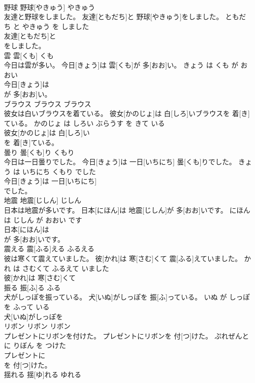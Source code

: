\documentclass[8pt]{extreport}
\begin{document}
\begin{CJK}{UTF8}{min}
\\	野球	野球[やきゅう]	やきゅう	
\\	友達と野球をしました。	友達[ともだち]と 野球[やきゅう]をしました。	ともだち と やきゅう を しました	
\\	友達[ともだち]と
\\	をしました。		
\\	雲	雲[くも]	くも	
\\	今日は雲が多い。	今日[きょう]は 雲[くも]が 多[おお]い。	きょう は くも が おおい	
\\	今日[きょう]は
\\	が 多[おお]い。		
\\	ブラウス	ブラウス	ブラウス	
\\	彼女は白いブラウスを着ている。	彼女[かのじょ]は 白[しろ]いブラウスを 着[き]ている。	かのじょ は しろい ぶらうす を きて いる	
\\	彼女[かのじょ]は 白[しろ]い
\\	を 着[き]ている。		
\\	曇り	曇[くも]り	くもり	
\\	今日は一日曇りでした。	今日[きょう]は 一日[いちにち] 曇[くも]りでした。	きょう は いちにち くもり でした	
\\	今日[きょう]は 一日[いちにち]
\\	でした。		
\\	地震	地震[じしん]	じしん	
\\	日本は地震が多いです。	日本[にほん]は 地震[じしん]が 多[おお]いです。	にほん は じしん が おおい です	
\\	日本[にほん]は
\\	が 多[おお]いです。		
\\	震える	震[ふる]える	ふるえる	
\\	彼は寒くて震えていました。	彼[かれ]は 寒[さむ]くて 震[ふる]えていました。	かれ は さむくて ふるえて いました	
\\	彼[かれ]は 寒[さむ]くて
\\	振る	振[ふ]る	ふる	
\\	犬がしっぽを振っている。	犬[いぬ]がしっぽを 振[ふ]っている。	いぬ が しっぽ を ふって いる	
\\	犬[いぬ]がしっぽを
\\	リボン	リボン	リボン	
\\	プレゼントにリボンを付けた。	プレゼントにリボンを 付[つ]けた。	ぷれぜんと に りぼん を つけた	
\\	プレゼントに
\\	を 付[つ]けた。		
\\	揺れる	揺[ゆ]れる	ゆれる	

\end{CJK}
\end{document}
